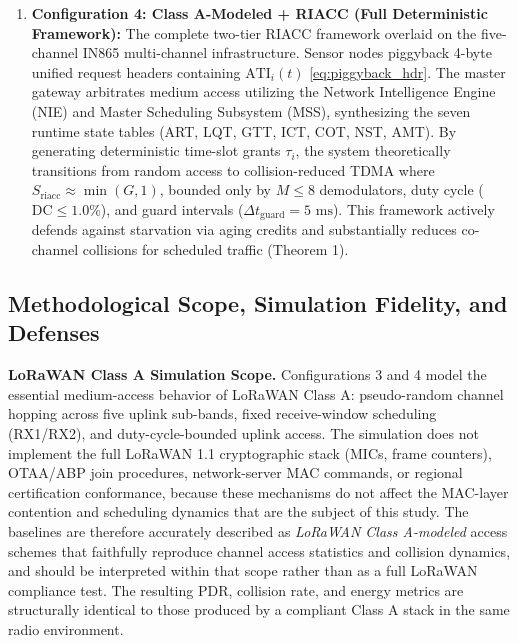 \documentclass[preprint,review,12pt]{elsarticle}
\begin{document}
\begin{enumerate}
    \item \textbf{Configuration 4: Class A-Modeled + RIACC (Full Deterministic Framework):} The complete two-tier RIACC framework overlaid on the five-channel IN865 multi-channel infrastructure. Sensor nodes piggyback 4-byte unified request headers containing $\text{ATI}_i(t)$ \eqref{eq:piggyback_hdr}. The master gateway arbitrates medium access utilizing the Network Intelligence Engine (NIE) and Master Scheduling Subsystem (MSS), synthesizing the seven runtime state tables (ART, LQT, GTT, ICT, COT, NST, AMT). By generating deterministic time-slot grants $\tau_{i}$, the system theoretically transitions from random access to collision-reduced TDMA where $S_{\text{riacc}} \approx \min(G, 1)$, bounded only by $M \le 8$ demodulators, duty cycle ($\text{DC} \le 1.0\%$), and guard intervals ($\Delta t_{\text{guard}} = 5\text{ ms}$). This framework actively defends against starvation via aging credits and substantially reduces co-channel collisions for scheduled traffic (Theorem 1).

\end{enumerate}

\subsection{Methodological Scope, Simulation Fidelity, and Defenses}

\label{sec:methodology_defense}

\textbf{LoRaWAN Class A Simulation Scope.} Configurations 3 and 4 model the essential medium-access behavior of LoRaWAN Class A: pseudo-random channel hopping across five uplink sub-bands, fixed receive-window scheduling (RX1/RX2), and duty-cycle-bounded uplink access. The simulation does not implement the full LoRaWAN 1.1 cryptographic stack (MICs, frame counters), OTAA/ABP join procedures, network-server MAC commands, or regional certification conformance, because these mechanisms do not affect the MAC-layer contention and scheduling dynamics that are the subject of this study. The baselines are therefore accurately described as \emph{LoRaWAN Class A-modeled} access schemes that faithfully reproduce channel access statistics and collision dynamics, and should be interpreted within that scope rather than as a full LoRaWAN compliance test. The resulting PDR, collision rate, and energy metrics are structurally identical to those produced by a compliant Class A stack in the same radio environment.
\end{document}

